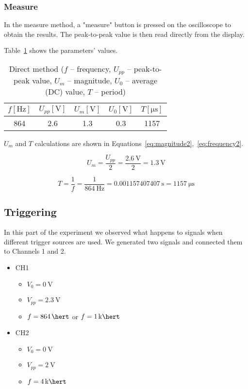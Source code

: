 \subsubsection*{Measure}

In the measure method, a "measure" button is pressed on the oscilloscope to obtain the results. The peak-to-peak value is then read directly from the display.

Table~\ref{tab:measure-method} shows the parameters' values.

\begin{table}[H]
	\centering
	\begin{tabular}{c|c|c|c|c}
		$f [\unit{\hertz}]$ & $U_{pp} [\unit{\volt}]$ & $U_{m} [\unit{\volt}]$ & $U_{0} [\unit{\volt}]$ & $T [\unit{\micro\second}]$\\
		\hline
		864 & 2.6 & 1.3 & 0.3 & 1157
	\end{tabular}
	\caption{Direct method ($f$ -- frequency, $U_{pp}$ -- peak-to-peak value, $U_{m}$ -- magnitude, $U_{0}$ -- average (DC) value, $T$ -- period)}
	\label{tab:measure-method}
\end{table}   

$U_{m}$ and $T$ calculations are shown in Equations~\ref{eq:magnitude2},~\ref{eq:frequency2}.

\begin{equation}
	U_{m} = \frac{U_{pp}}{2} = \frac{\SI{2.6}{\volt}}{2} = \SI{1.3}{\volt}
	\label{eq:magnitude2}
\end{equation}

\begin{equation}
	T = \frac{1}{f} = \frac{1}{\SI{864}{\hertz}} = \SI{0.001157407407}{\second} = \SI{1157}{\micro\second}
	\label{eq:frequency2}
\end{equation}

\subsection{Triggering}

In this part of the experiment we observed what happens to signals when different trigger sources are used. We generated two signals and connected them to Channels 1 and 2.

\begin{itemize}
	\item CH1
	\begin{itemize}
		\item $V_{0} = \SI{0}{\volt}$
		\item $V_{pp} = \SI{2.3}{\volt}$
		\item $f = \SI{864}{\hert}$ or $f = \SI{1}{\kilo\hert}$
	\end{itemize}
	\item CH2
	\begin{itemize}
		\item $V_{0} = \SI{0}{\volt}$
		\item $V_{pp} = \SI{2}{\volt}$
		\item $f = \SI{4}{\kilo\hert}$
	\end{itemize}
\end{itemize}

